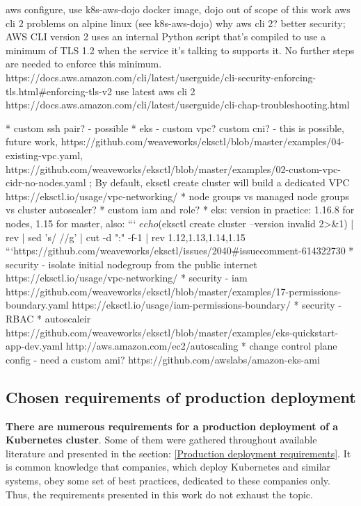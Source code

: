 aws configure, use k8s-aws-dojo docker image, dojo out of scope of this work
aws cli 2 problems on alpine linux (see k8s-aws-dojo)
why aws cli 2? better security; AWS CLI version 2 uses an internal Python script that's compiled to use a minimum of TLS 1.2 when the service it's talking to supports it. No further steps are needed to enforce this minimum. https://docs.aws.amazon.com/cli/latest/userguide/cli-security-enforcing-tls.html#enforcing-tls-v2
 use latest aws cli 2 https://docs.aws.amazon.com/cli/latest/userguide/cli-chap-troubleshooting.html

* custom ssh pair? - possible
* eks - custom vpc? custom cni? - this is possible, future work, https://github.com/weaveworks/eksctl/blob/master/examples/04-existing-vpc.yaml, https://github.com/weaveworks/eksctl/blob/master/examples/02-custom-vpc-cidr-no-nodes.yaml ; By default, eksctl create cluster will build a dedicated VPC https://eksctl.io/usage/vpc-networking/
* node groups vs managed node groups vs cluster autoscaler?
* custom iam and role?
* eks: version in practice: 1.16.8 for nodes, 1.15 for master, also:
```
$ echo $(eksctl create cluster --version invalid 2>&1) | rev | sed 's/ //g' | cut -d ":" -f-1 | rev
1.12,1.13,1.14,1.15
```https://github.com/weaveworks/eksctl/issues/2040#issuecomment-614322730
* security - isolate initial nodegroup from the public internet https://eksctl.io/usage/vpc-networking/
* security - iam https://github.com/weaveworks/eksctl/blob/master/examples/17-permissions-boundary.yaml https://eksctl.io/usage/iam-permissions-boundary/
* security - RBAC
* autoscaleir https://github.com/weaveworks/eksctl/blob/master/examples/eks-quickstart-app-dev.yaml http://aws.amazon.com/ec2/autoscaling
* change control plane config - need a custom ami? https://github.com/awslabs/amazon-eks-ami

\subsection{Chosen requirements of production deployment}
\textbf{There are numerous requirements for a production deployment of a Kubernetes cluster}. Some of them were gathered throughout available literature and presented in the section: \ref{Production deployment requirements}. It is common knowledge that companies, which deploy Kubernetes and similar systems, obey some set of best practices, dedicated to these companies only. Thus, the requirements presented in this work do not exhaust the topic.

